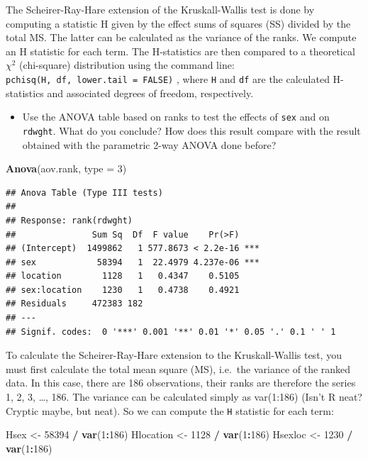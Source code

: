 \documentclass[
  12pt,
]{book}
\newenvironment{Shaded}{\begin{snugshade}}{\end{snugshade}}
\newcommand{\DataTypeTok}[1]{\textcolor[rgb]{0.13,0.29,0.53}{#1}}
\newcommand{\DecValTok}[1]{\textcolor[rgb]{0.00,0.00,0.81}{#1}}
\newcommand{\KeywordTok}[1]{\textcolor[rgb]{0.13,0.29,0.53}{\textbf{#1}}}
\newcommand{\NormalTok}[1]{#1}
\newcommand{\OperatorTok}[1]{\textcolor[rgb]{0.81,0.36,0.00}{\textbf{#1}}}
\newcommand{\StringTok}[1]{\textcolor[rgb]{0.31,0.60,0.02}{#1}}
\providecommand{\tightlist}{%
  \setlength{\itemsep}{0pt}\setlength{\parskip}{0pt}}
\begin{document}
The Scheirer-Ray-Hare extension of the Kruskall-Wallis test is done by computing a statistic H given by the effect sums of squares (SS) divided by the total MS. The latter can be calculated as the variance of the ranks. We compute an H statistic for each term. The H-statistics are then compared to a theoretical \(\chi^2\) (chi-square) distribution using the command line: \texttt{pchisq(H,\ df,\ lower.tail\ =\ FALSE)} , where \texttt{H} and \texttt{df} are the calculated H-statistics and associated degrees of freedom, respectively.

\begin{itemize}
\tightlist
\item
  Use the ANOVA table based on ranks to test the effects of \texttt{sex} and on \texttt{rdwght}. What do you conclude? How does this result compare with the result obtained with the parametric 2-way ANOVA done before?
\end{itemize}

\begin{Shaded}
\begin{Highlighting}[]
\KeywordTok{Anova}\NormalTok{(aov.rank, }\DataTypeTok{type =} \DecValTok{3}\NormalTok{)}
\end{Highlighting}
\end{Shaded}

\begin{verbatim}
## Anova Table (Type III tests)
## 
## Response: rank(rdwght)
##               Sum Sq  Df  F value    Pr(>F)    
## (Intercept)  1499862   1 577.8673 < 2.2e-16 ***
## sex            58394   1  22.4979 4.237e-06 ***
## location        1128   1   0.4347    0.5105    
## sex:location    1230   1   0.4738    0.4921    
## Residuals     472383 182                       
## ---
## Signif. codes:  0 '***' 0.001 '**' 0.01 '*' 0.05 '.' 0.1 ' ' 1
\end{verbatim}

To calculate the Scheirer-Ray-Hare extension to the Kruskall-Wallis test, you must first calculate the total mean square (MS), i.e.~the variance of the ranked data. In this case, there are 186 observations, their ranks are therefore the series 1, 2, 3, \ldots, 186. The variance can be calculated simply as var(1:186) (Isn't R neat? Cryptic maybe, but neat). So we can compute the \texttt{H} statistic for each term:

\begin{Shaded}
\begin{Highlighting}[]
\NormalTok{Hsex \textless{}{-}}\StringTok{ }\DecValTok{58394} \OperatorTok{/}\StringTok{ }\KeywordTok{var}\NormalTok{(}\DecValTok{1}\OperatorTok{:}\DecValTok{186}\NormalTok{)}
\NormalTok{Hlocation \textless{}{-}}\StringTok{ }\DecValTok{1128} \OperatorTok{/}\StringTok{ }\KeywordTok{var}\NormalTok{(}\DecValTok{1}\OperatorTok{:}\DecValTok{186}\NormalTok{)}
\NormalTok{Hsexloc \textless{}{-}}\StringTok{ }\DecValTok{1230} \OperatorTok{/}\StringTok{ }\KeywordTok{var}\NormalTok{(}\DecValTok{1}\OperatorTok{:}\DecValTok{186}\NormalTok{)}
\end{Highlighting}
\end{Shaded}
\end{document}
